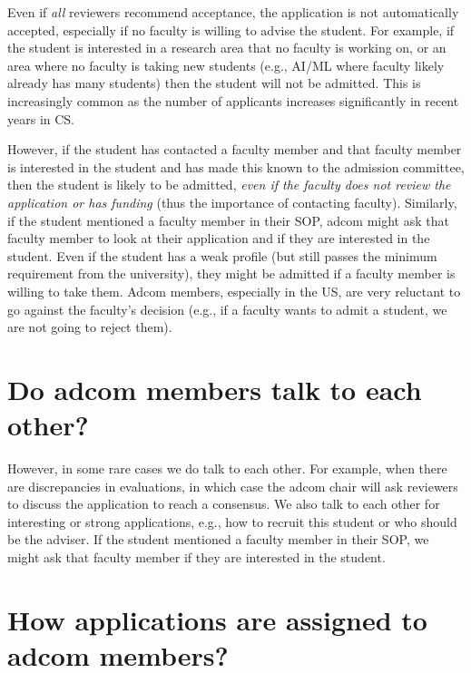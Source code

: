 \documentclass[oneside,11pt,dvipsnames]{book}
\def\sectioninfo#1{%
  \addcontentsline{toc}{sectioninfo}{%
    \noexpand\numberline{}\color{black}{#1}}%
}
\begin{document}
Even if \emph{all} reviewers recommend acceptance, the application is not automatically accepted, especially if no faculty is willing to advise the student. For example, if the student is interested in a research area that no faculty is working on, or an area where no faculty is taking new students (e.g., AI/ML where faculty likely already has many students) then the student will not be admitted.  This is increasingly common as the number of applicants increases significantly in recent years in CS.

However, if the student has contacted a faculty member and that faculty member is interested in the student and has made this known to the admission committee, then the student is likely to be admitted, \emph{even if the faculty does not review the application or has funding} (thus the importance of contacting faculty). 
Similarly, if the student mentioned a faculty member in their SOP, adcom might ask that faculty member to look at their application and if they are interested in the student.  Even if the student has a weak profile (but still passes the minimum requirement from the university), they might be admitted if a faculty member is willing to take them. Adcom members, especially in the US, are very reluctant to go against the faculty's decision (e.g., if a faculty wants to admit a student, we are not going to reject them).


\section{Do adcom members talk to each other?}\label{sec:adcom-discuss}
\sectioninfo{Sometimes adcom members discuss applicants, but in most cases they make independent decisions.}

However, in some rare cases we do talk to each other.  For example, when there are discrepancies in evaluations, in which case the adcom chair will ask reviewers to discuss the application to reach a consensus.  We also talk to each other for interesting or strong applications, e.g., how to recruit this student or who should be the adviser. 
If the student mentioned a faculty member in their SOP, we might ask that faculty member if they are interested in the student. 



\section{How applications are assigned to adcom members?}\label{sec:applications-assigned}
\sectioninfo{Adcom members only review applications assigned to them (typically matching their expertise) and rarely get involved in other applications}
\end{document}
